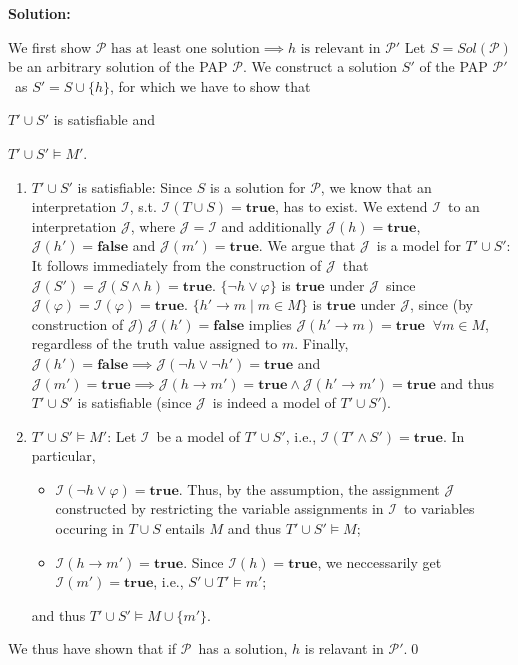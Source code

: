 \documentclass [11pt]{article}
\renewcommand{\phi}{\varphi}
\newcommand{\True}{\mathbf{true}}
\newcommand{\False}{\mathbf{false}}
\newcommand{\pap}{\ensuremath{\mathcal{P}}}
\newcommand{\papp}{\ensuremath{\mathcal{P'}}}
\newcommand{\mI}{\ensuremath{\mathcal{I}}}
\newcommand{\mJ}{\ensuremath{\mathcal{J}}}
\begin{document}
\noindent
\textbf{Solution:}

We first show 
$
\pap \text{ has at least one solution} \implies h \text{ is relevant in } \papp
$
Let $S = Sol(\pap)$ be an arbitrary solution of the PAP \pap. 
We construct a solution $S'$ of the PAP \papp\ as $S' = S \cup \{h\}$, for which we have to show that
\begin{inparaenum}
 \item $T' \cup S'$ is satisfiable and
 \item $T' \cup S' \models M'$.
\end{inparaenum}

\begin{enumerate}
 \item $T' \cup S'$ is satisfiable:
Since $S$ is a solution for \pap, we know that an interpretation \mI, s.t. $\mI(T\cup S) = \True$, has to exist.
We extend \mI\ to an interpretation \mJ, where $\mJ = \mI$ and additionally $\mJ(h) = \True$, $\mJ(h') = \False$ and $\mJ(m') = \True$.
We argue that \mJ\ is a model for $T' \cup S'$:
It follows immediately from the construction of \mJ\ that $\mJ(S') = \mJ(S \land h) = \True$.
$\{\neg h \lor \phi\}$ is $\True$ under \mJ\ since $\mJ(\phi) = \mI(\phi) = \True$.
$\{h' \rightarrow m \mid m \in M \}$ is $\True$ under \mJ, since (by construction of \mJ) $\mJ(h') = \False$ implies $\mJ(h' \rightarrow m) = \True \;\;\forall m \in M$, regardless of the truth value assigned to $m$.
Finally, $\mJ(h') = \False \implies \mJ(\neg h \lor \neg h') = \True$ and $\mJ(m') = \True \implies \mJ(h\rightarrow m') = \True \land \mJ(h'\rightarrow m') = \True$ and thus $T' \cup S'$ is satisfiable (since \mJ\ is indeed a model of $T' \cup S'$).
 \item $T' \cup S' \models M'$: 
Let \mI\ be a model of $T' \cup S'$, i.e., $\mI(T' \land S')=\True$. In particular,
\begin{itemize}
\item $\mI(\neg h \lor \phi) = \True$. 
Thus, by the assumption, the assignment $\mJ$ constructed by restricting the variable assignments in \mI\ to variables occuring in $T \cup S$ entails $M$ and thus $T' \cup S' \models M$;
\item $\mI(h \rightarrow m') = \True$. Since $\mI(h) = \True$, we neccessarily get $\mI(m') = \True$, i.e., $S' \cup T' \models m'$;
\end{itemize}
and thus $T' \cup S' \models M\cup \{m'\}$.
\end{enumerate}
We thus have shown that if \pap\ has a solution, $h$ is relavant in \papp.\qed
\end{document}
